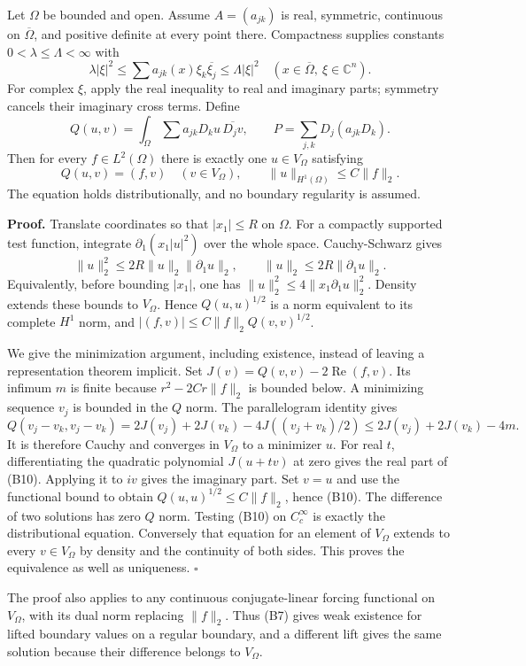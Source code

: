 \documentclass[
  11pt,
]{article}
\begin{document}
Let \(\Omega\) be bounded and open. Assume \(A=(a_{jk})\) is real,
symmetric, continuous on \(\overline\Omega\), and positive definite at
every point there. Compactness supplies constants
\(0<\lambda\leq\Lambda<\infty\) with \[
 \lambda|\xi|^2\leq \sum a_{jk}(x)\xi_k\overline{\xi_j}
 \leq\Lambda|\xi|^2\quad(x\in\overline\Omega,\ \xi\in\mathbb C^n). \tag{B8}
\] For complex \(\xi\), apply the real inequality to real and imaginary
parts; symmetry cancels their imaginary cross terms. Define \[
 Q(u,v)=\int_\Omega\sum a_{jk}D_ku\,\overline{D_jv},
 \qquad P=\sum_{j,k}D_j(a_{jk}D_k). \tag{B9}
\] Then for every \(f\in L^2(\Omega)\) there is exactly one
\(u\in V_\Omega\) satisfying \[
 Q(u,v)=(f,v)\quad(v\in V_\Omega),\qquad
 \|u\|_{H^1(\Omega)}\leq C\|f\|_2. \tag{B10}
\] The equation holds distributionally, and no boundary regularity is
assumed.

\textbf{Proof.} Translate coordinates so that \(|x_1|\leq R\) on
\(\Omega\). For a compactly supported test function, integrate
\(\partial_1(x_1|u|^2)\) over the whole space. Cauchy-Schwarz gives \[
 \|u\|_2^2\leq2R\|u\|_2\|\partial_1u\|_2,
 \qquad \|u\|_2\leq2R\|\partial_1u\|_2. \tag{B11}
\] Equivalently, before bounding \(|x_1|\), one has
\(\|u\|_2^2\leq4\|x_1\partial_1u\|_2^2\). Density extends these bounds
to \(V_\Omega\). Hence \(Q(u,u)^{1/2}\) is a norm equivalent to its
complete \(H^1\) norm, and \(|(f,v)|\leq C\|f\|_2 Q(v,v)^{1/2}\).

We give the minimization argument, including existence, instead of
leaving a representation theorem implicit. Set
\(J(v)=Q(v,v)-2\operatorname{Re}(f,v)\). Its infimum \(m\) is finite
because \(r^2-2Cr\|f\|_2\) is bounded below. A minimizing sequence
\(v_j\) is bounded in the \(Q\) norm. The parallelogram identity gives
\[
 Q(v_j-v_k,v_j-v_k)
 =2J(v_j)+2J(v_k)-4J((v_j+v_k)/2)
 \leq2J(v_j)+2J(v_k)-4m. \tag{B12}
\] It is therefore Cauchy and converges in \(V_\Omega\) to a minimizer
\(u\). For real \(t\), differentiating the quadratic polynomial
\(J(u+tv)\) at zero gives the real part of (B10). Applying it to \(iv\)
gives the imaginary part. Set \(v=u\) and use the functional bound to
obtain \(Q(u,u)^{1/2}\leq C\|f\|_2\), hence (B10). The difference of two
solutions has zero \(Q\) norm. Testing (B10) on \(C_c^\infty\) is
exactly the distributional equation. Conversely that equation for an
element of \(V_\Omega\) extends to every \(v\in V_\Omega\) by density
and the continuity of both sides. This proves the equivalence as well as
uniqueness. \(\square\)

The proof also applies to any continuous conjugate-linear forcing
functional on \(V_\Omega\), with its dual norm replacing \(\|f\|_2\).
Thus (B7) gives weak existence for lifted boundary values on a regular
boundary, and a different lift gives the same solution because their
difference belongs to \(V_\Omega\).
\end{document}
